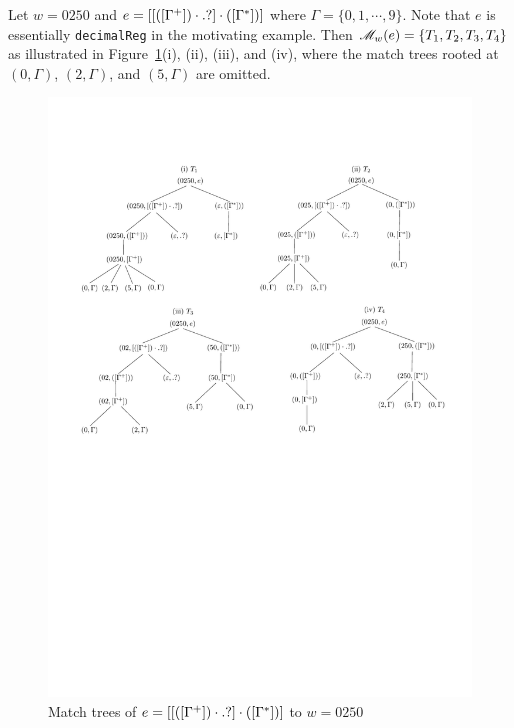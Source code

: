 \begin{example}\label{exmp-regex-match-tree}
Let $w= 0250$ and $e = [[([\Gamma^+])\cdot .?] \cdot ([\Gamma^*])]$ where $\Gamma = \{0,1,\cdots,9\}$. Note that $e$ is essentially {\tt decimalReg} in the motivating example. Then $\mathscr{M}_{w}(e) = \{T_1,T_2,T_3, T_4\}$ as illustrated in Figure~\ref{fig-regex-semantics-decimal}(i), (ii), (iii), and (iv), where the match trees rooted at $(0, \Gamma)$, $(2, \Gamma)$, and $(5, \Gamma)$ are omitted. %
\begin{figure}[htb]
\centering
\includegraphics[width=1\textwidth]{regex-semantics-decimal.pdf}
\caption{Match trees of $e=[[([\Gamma^+])\cdot .?] \cdot ([\Gamma^*])]$ to $w= 0250$}
\label{fig-regex-semantics-decimal}
\vspace{-4mm}
\end{figure}
 \end{example}



